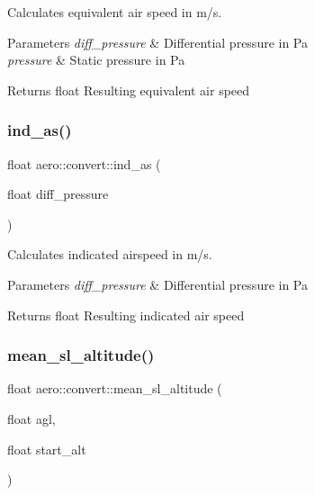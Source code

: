 Calculates equivalent air speed in m/s. 


\begin{DoxyParams}{Parameters}
{\em diff\+\_\+pressure} & Differential pressure in Pa \\
\hline
{\em pressure} & Static pressure in Pa \\
\hline
\end{DoxyParams}
\begin{DoxyReturn}{Returns}
float Resulting equivalent air speed 
\end{DoxyReturn}
\mbox{\label{namespaceaero_1_1convert_ae3cb87c1ce3ff50f8af2180be377562d}} 
\subsubsection{\texorpdfstring{ind\+\_\+as()}{ind\_as()}}
{\footnotesize\ttfamily float aero\+::convert\+::ind\+\_\+as (\begin{DoxyParamCaption}\item[{float}]{diff\+\_\+pressure }\end{DoxyParamCaption})}



Calculates indicated airspeed in m/s. 


\begin{DoxyParams}{Parameters}
{\em diff\+\_\+pressure} & Differential pressure in Pa \\
\hline
\end{DoxyParams}
\begin{DoxyReturn}{Returns}
float Resulting indicated air speed 
\end{DoxyReturn}
\mbox{\label{namespaceaero_1_1convert_a41de71a2cd962f132ed1725f2bf3322d}} 
\subsubsection{\texorpdfstring{mean\+\_\+sl\+\_\+altitude()}{mean\_sl\_altitude()}}
{\footnotesize\ttfamily float aero\+::convert\+::mean\+\_\+sl\+\_\+altitude (\begin{DoxyParamCaption}\item[{float}]{agl,  }\item[{float}]{start\+\_\+alt }\end{DoxyParamCaption})}



